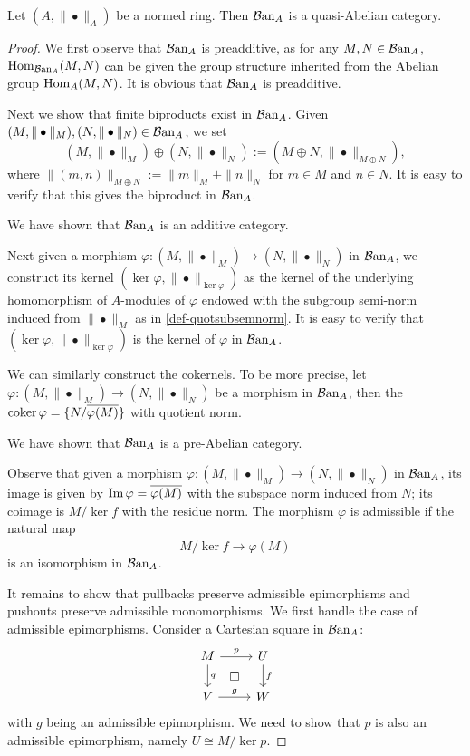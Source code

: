 \begin{thm}
    Let $(A,\|\bullet\|_A)$ be a normed ring. Then $\mathcal{B}\mathrm{an}_A$ is a quasi-Abelian category.
\end{thm}
\begin{proof}
    We first observe that $\mathcal{B}\mathrm{an}_A$ is preadditive, as for any $M,N\in \mathcal{B}\mathrm{an}_A$, $\operatorname{Hom}_{\mathcal{B}\mathrm{an}_A}(M,N)$ can be given the group structure inherited from the Abelian group $\operatorname{Hom}_A(M,N)$. It is obvious that $\mathcal{B}\mathrm{an}_A$ is preadditive.

    Next we show that finite biproducts exist in $\mathcal{B}\mathrm{an}_A$. Given $(M,\|\bullet\|_{M}),(N,\|\bullet\|_{N})\in \mathcal{B}\mathrm{an}_A$, we set 
    \begin{equation}\label{eq-normedmodulesum}
        (M,\|\bullet\|_{M})\oplus  (N,\|\bullet\|_{N}):=(M\oplus N,\|\bullet\|_{M\oplus N}),
    \end{equation}
    where $\|(m,n)\|_{M\oplus N}:=\|m\|_M+\|n\|_N$ for $m\in M$ and $n\in N$. It is easy to verify that this gives the biproduct in $\mathcal{B}\mathrm{an}_A$. 

    We have shown that $\mathcal{B}\mathrm{an}_A$ is an additive category.

    Next given a morphism $\varphi:(M,\|\bullet\|_M)\rightarrow (N,\|\bullet\|_N)$ in $\mathcal{B}\mathrm{an}_A$, we construct its kernel $(\ker \varphi, \|\bullet\|_{\ker\varphi})$ as the kernel of the underlying homomorphism of $A$-modules of $\varphi$ endowed with the subgroup semi-norm induced from $\|\bullet\|_M$ as in \cref{def-quotsubsemnorm}. It is easy to verify that $(\ker \varphi, \|\bullet\|_{\ker\varphi})$ is the kernel of $\varphi$ in  $\mathcal{B}\mathrm{an}_A$. 

    We can similarly construct the cokernels. To be more precise, let $\varphi:(M,\|\bullet\|_M)\rightarrow (N,\|\bullet\|_N)$ be a morphism in $\mathcal{B}\mathrm{an}_A$, then the $\operatorname{coker} \varphi=\{N/\overline{\varphi(M)}\}$ with quotient norm.

    We have shown that $\mathcal{B}\mathrm{an}_A$ is a pre-Abelian category. 
    
    Observe that given a morphism  $\varphi:(M,\|\bullet\|_M)\rightarrow (N,\|\bullet\|_N)$ in $\mathcal{B}\mathrm{an}_A$, its image is given by $\operatorname{Im} \varphi=\overline{\varphi(M)}$ with the subspace norm induced from $N$; its coimage is $M/\ker f$ with the residue norm. The morphism $\varphi$ is admissible if the natural map
    \[
        M/\ker f\rightarrow \overline{\varphi(M)}
    \]
    is an isomorphism in $\mathcal{B}\mathrm{an}_A$.

    It remains to show that pullbacks preserve admissible epimorphisms and pushouts preserve admissible monomorphisms. We first handle the case of admissible epimorphisms. Consider a Cartesian square in $\mathcal{B}\mathrm{an}_A$:
    \[
        \begin{tikzcd}
            M \arrow[r, "p"] \arrow[d, "q"] \arrow[rd, "\square", phantom] & U \arrow[d, "f"] \\
            V \arrow[r, "g"]                                               & W               
        \end{tikzcd}  
    \]
    with $g$ being an admissible epimorphism. We need to show that $p$ is also an admissible epimorphism, namely $U\cong M/\ker p$.


\end{proof}
